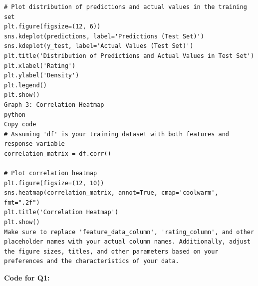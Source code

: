 \documentclass{article}
\begin{document}
\begin{titlepage}
\begin{verbatim}
# Plot distribution of predictions and actual values in the training set
plt.figure(figsize=(12, 6))
sns.kdeplot(predictions, label='Predictions (Test Set)')
sns.kdeplot(y_test, label='Actual Values (Test Set)')
plt.title('Distribution of Predictions and Actual Values in Test Set')
plt.xlabel('Rating')
plt.ylabel('Density')
plt.legend()
plt.show()
Graph 3: Correlation Heatmap
python
Copy code
# Assuming 'df' is your training dataset with both features and response variable
correlation_matrix = df.corr()

# Plot correlation heatmap
plt.figure(figsize=(12, 10))
sns.heatmap(correlation_matrix, annot=True, cmap='coolwarm', fmt=".2f")
plt.title('Correlation Heatmap')
plt.show()
Make sure to replace 'feature_data_column', 'rating_column', and other placeholder names with your actual column names. Additionally, adjust the figure sizes, titles, and other parameters based on your preferences and the characteristics of your data.
\end{verbatim}
\end{titlepage}
\textbf{Code for Q1:}
\end{document}
